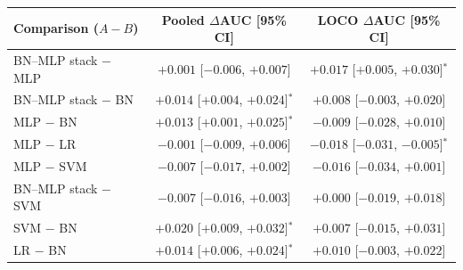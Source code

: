 \begin{tabular}{lcc}
\toprule
Comparison ($A-B$) & Pooled $\Delta$AUC [95\% CI] & LOCO $\Delta$AUC [95\% CI] \\
\midrule
BN--MLP stack $-$ MLP & $+0.001$ [$-0.006$, $+0.007$] & $+0.017$ [$+0.005$, $+0.030$]$^{*}$ \\
BN--MLP stack $-$ BN & $+0.014$ [$+0.004$, $+0.024$]$^{*}$ & $+0.008$ [$-0.003$, $+0.020$] \\
MLP $-$ BN & $+0.013$ [$+0.001$, $+0.025$]$^{*}$ & $-0.009$ [$-0.028$, $+0.010$] \\
MLP $-$ LR & $-0.001$ [$-0.009$, $+0.006$] & $-0.018$ [$-0.031$, $-0.005$]$^{*}$ \\
MLP $-$ SVM & $-0.007$ [$-0.017$, $+0.002$] & $-0.016$ [$-0.034$, $+0.001$] \\
BN--MLP stack $-$ SVM & $-0.007$ [$-0.016$, $+0.003$] & $+0.000$ [$-0.019$, $+0.018$] \\
SVM $-$ BN & $+0.020$ [$+0.009$, $+0.032$]$^{*}$ & $+0.007$ [$-0.015$, $+0.031$] \\
LR $-$ BN & $+0.014$ [$+0.006$, $+0.024$]$^{*}$ & $+0.010$ [$-0.003$, $+0.022$] \\
\bottomrule
\end{tabular}
